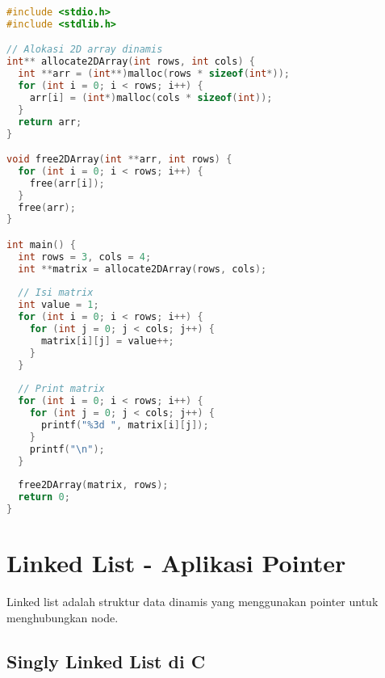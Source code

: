 \documentclass[../main.tex]{subfiles}
\begin{document}
\begin{lstlisting}[language=C, caption={Double pointer untuk 2D array}]
#include <stdio.h>
#include <stdlib.h>

// Alokasi 2D array dinamis
int** allocate2DArray(int rows, int cols) {
  int **arr = (int**)malloc(rows * sizeof(int*));
  for (int i = 0; i < rows; i++) {
    arr[i] = (int*)malloc(cols * sizeof(int));
  }
  return arr;
}

void free2DArray(int **arr, int rows) {
  for (int i = 0; i < rows; i++) {
    free(arr[i]);
  }
  free(arr);
}

int main() {
  int rows = 3, cols = 4;
  int **matrix = allocate2DArray(rows, cols);
  
  // Isi matrix
  int value = 1;
  for (int i = 0; i < rows; i++) {
    for (int j = 0; j < cols; j++) {
      matrix[i][j] = value++;
    }
  }
  
  // Print matrix
  for (int i = 0; i < rows; i++) {
    for (int j = 0; j < cols; j++) {
      printf("%3d ", matrix[i][j]);
    }
    printf("\n");
  }
  
  free2DArray(matrix, rows);
  return 0;
}
\end{lstlisting}

\section{Linked List - Aplikasi Pointer}

Linked list adalah struktur data dinamis yang menggunakan pointer untuk menghubungkan node.

\subsection{Singly Linked List di C}
\end{document}
